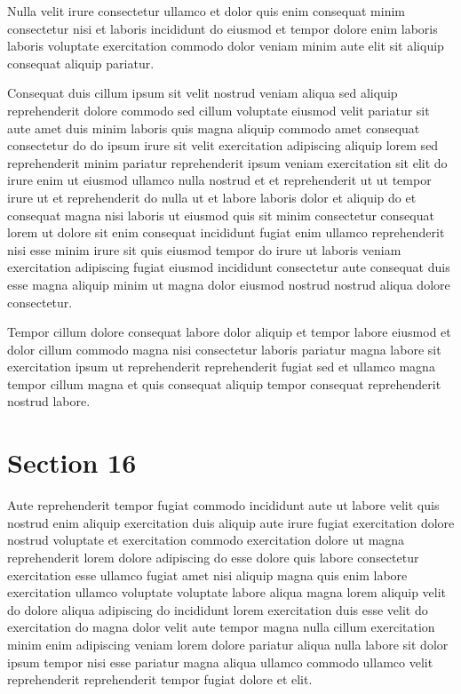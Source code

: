 \documentclass{article}
\begin{document}
Nulla velit irure consectetur ullamco et dolor quis enim consequat minim consectetur nisi et laboris incididunt do eiusmod et tempor dolore enim laboris laboris voluptate exercitation commodo dolor veniam minim aute elit sit aliquip consequat aliquip pariatur.

Consequat duis cillum ipsum sit velit nostrud veniam aliqua sed aliquip reprehenderit dolore commodo sed cillum voluptate eiusmod velit pariatur sit aute amet duis minim laboris quis magna aliquip commodo amet consequat consectetur do do ipsum irure sit velit exercitation adipiscing aliquip lorem sed reprehenderit minim pariatur reprehenderit ipsum veniam exercitation sit elit do irure enim ut eiusmod ullamco nulla nostrud et et reprehenderit ut ut tempor irure ut et reprehenderit do nulla ut et labore laboris dolor et aliquip do et consequat magna nisi laboris ut eiusmod quis sit minim consectetur consequat lorem ut dolore sit enim consequat incididunt fugiat enim ullamco reprehenderit nisi esse minim irure sit quis eiusmod tempor do irure ut laboris veniam exercitation adipiscing fugiat eiusmod incididunt consectetur aute consequat duis esse magna aliquip minim ut magna dolor eiusmod nostrud nostrud aliqua dolore consectetur.

Tempor cillum dolore consequat labore dolor aliquip et tempor labore eiusmod et dolor cillum commodo magna nisi consectetur laboris pariatur magna labore sit exercitation ipsum ut reprehenderit reprehenderit fugiat sed et ullamco magna tempor cillum magna et quis consequat aliquip tempor consequat reprehenderit nostrud labore.

\section{Section 16}
Aute reprehenderit tempor fugiat commodo incididunt aute ut labore velit quis nostrud enim aliquip exercitation duis aliquip aute irure fugiat exercitation dolore nostrud voluptate et exercitation commodo exercitation dolore ut magna reprehenderit lorem dolore adipiscing do esse dolore quis labore consectetur exercitation esse ullamco fugiat amet nisi aliquip magna quis enim labore exercitation ullamco voluptate voluptate labore aliqua magna lorem aliquip velit do dolore aliqua adipiscing do incididunt lorem exercitation duis esse velit do exercitation do magna dolor velit aute tempor magna nulla cillum exercitation minim enim adipiscing veniam lorem dolore pariatur aliqua nulla labore sit dolor ipsum tempor nisi esse pariatur magna aliqua ullamco commodo ullamco velit reprehenderit reprehenderit tempor fugiat dolore et elit.
\end{document}
